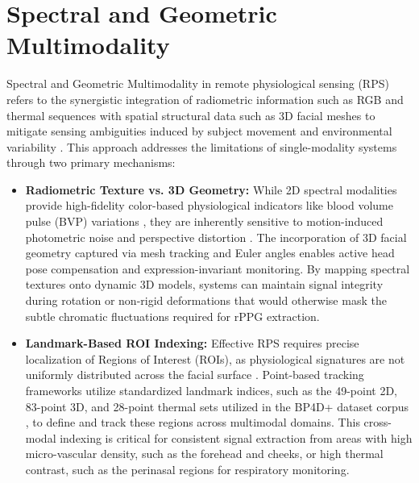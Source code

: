 \section{Spectral and Geometric Multimodality}
\label{sec:spectral-geometric}
Spectral and Geometric Multimodality in remote physiological sensing (RPS)
refers to the synergistic integration of radiometric information such as RGB and
thermal sequences with spatial structural data such as 3D facial meshes to
mitigate sensing ambiguities induced by subject movement and environmental
variability \cite{hassanpour2025contactless}. This approach addresses the limitations
of single-modality systems through two primary mechanisms:

\begin{itemize}
    \item \textbf{Radiometric Texture vs. 3D Geometry:} While 2D spectral
        modalities provide high-fidelity color-based physiological indicators
        like blood volume pulse (BVP) variations
        \cite{wang2017algorithmic, cen2025robust}, they are inherently sensitive
        to motion-induced photometric noise and perspective distortion \cite{cen2025robust,
        islam2022radar}. The incorporation of 3D facial geometry captured via
        mesh tracking and Euler angles enables active head pose compensation and
        expression-invariant monitoring. By mapping spectral textures onto dynamic
        3D models, systems can maintain signal integrity during rotation or non-rigid
        deformations that would otherwise mask the subtle chromatic fluctuations
        required for rPPG extraction.

    \item \textbf{Landmark-Based ROI Indexing:} Effective RPS requires precise
        localization of Regions of Interest (ROIs), as physiological signatures are
        not uniformly distributed across the facial surface \cite{cheng2024contactless,
        cho2019physiological}. Point-based tracking frameworks utilize
        standardized landmark indices, such as the 49-point 2D, 83-point 3D, and
        28-point thermal sets utilized in the BP4D+ dataset corpus \cite{zhang2014bp4d},
        to define and track these regions across multimodal domains. This cross-modal indexing
        is critical for consistent signal extraction from areas with high micro-vascular
        density, such as the forehead and cheeks, or high thermal contrast, such
        as the perinasal regions for respiratory monitoring.
\end{itemize}

